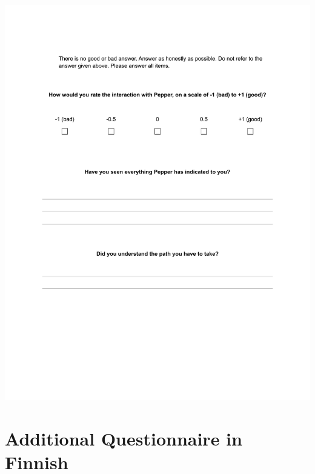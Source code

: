 \begin{center}
	\includegraphics[width=\textwidth]{figures/annexe1/english_additional_questionnaire.pdf} 
\end{center}

\section{Additional Questionnaire in Finnish}\label{app:add_questionnaire_fi}

